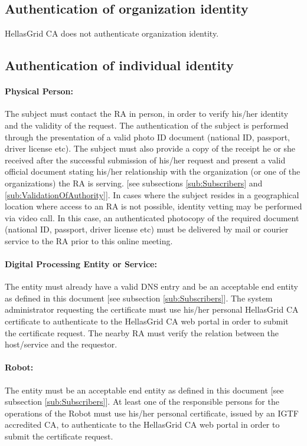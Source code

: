 \subsection{Authentication of organization identity}

HellasGrid CA does not authenticate organization identity.

\subsection{Authentication of individual identity}
\label{sub:AuthenticationOfIndividualIdentity}

\paragraph{Physical Person:} The subject must contact  the RA in person, in order to verify his/her identity and the validity of the request. The authentication of the subject is performed through the presentation of a valid photo ID document (national ID, passport, driver license etc). The subject must also provide a copy of the receipt he or she received after the successful submission of his/her request and present a valid official document stating his/her relationship with the organization (or one of the organizations) the RA is serving. [see subsections \ref{sub:Subscribers} and \ref{sub:ValidationOfAuthority}]. In cases where the subject resides in a geographical location where access to an RA is not possible, identity vetting may be performed via video call. In this case, an authenticated photocopy of the required document (national ID, passport, driver license etc) must be delivered by mail or courier service to the RA prior to this online meeting. 

\paragraph{Digital Processing Entity or Service:} The entity must already have a valid DNS entry and be an acceptable end entity as defined in this document [see subsection \ref{sub:Subscribers}]. The system administrator requesting the certificate must use his/her personal HellasGrid CA certificate to authenticate to the HellasGrid CA web portal in order to submit the certificate request. The nearby RA must verify the relation between the host/service and the requestor.

\paragraph{Robot:} The entity must be an acceptable end entity as defined in this document [see subsection \ref{sub:Subscribers}]. At least one of the responsible persons for the operations of the Robot must use his/her personal certificate, issued by an IGTF accredited CA, to authenticate to the HellasGrid CA web portal in order to submit the certificate request.

